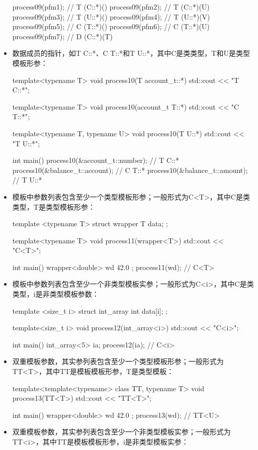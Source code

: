 \begin{itemize}
\begin{cpp}
{	process09(pfm1); // T (C::*)()
	process09(pfm2); // T (C::*)(U)
	process09(pfm3); // T (U::*)()
	process09(pfm4); // T (U::*)(V)
	process09(pfm5); // C (T::*)()
	process09(pfm6); // C (T::*)(U)
	process09(pfm7); // D (C::*)(T)
}
\end{cpp}
  \item 数据成员的指针，如T C::*、C T::*和T U::*，其中C是类类型，T和U是类型模板形参：

\begin{cpp}
template<typename T>
void process10(T account_t::*)
{ std::cout << "T C::*\n"; }

template<typename T>
void process10(account_t T::*)
{ std::cout << "C T::*\n"; }

template<typename T, typename U>
void process10(T U::*) { std::cout << "T U::*\n"; }

int main()
{
	process10(&account_t::number); // T C::*
	process10(&balance_t::account); // C T::*
	process10(&balance_t::amount); // T U::*
}
\end{cpp}
  \item 模板中参数列表包含至少一个类型模板形参；一般形式为C<T>，其中C是类类型，T是类型模板形参：

\begin{cpp}
template <typename T>
struct wrapper
{
	T data;
};

template<typename T>
void process11(wrapper<T>) { std::cout << "C<T>\n"; }

int main()
{
	wrapper<double> wd{ 42.0 };
	process11(wd); // C<T>
}
\end{cpp}
  \item 模板中参数列表包含至少一个非类型模板实参；一般形式为C<i>，其中C是类类型，i是非类型模板参数：

\begin{cpp}
template <size_t i>
struct int_array
{
	int data[i];
};

template<size_t i>
void process12(int_array<i>) { std::cout << "C<i>\n"; }

int main()
{
	int_array<5> ia{};
	process12(ia); // C<i>
}
\end{cpp}
  \item 双重模板参数，其实参列表包含至少一个类型模板形参；一般形式为TT<T>，其中TT是模板模板形参，T是类型模板：

\begin{cpp}
template<template<typename> class TT, typename T>
void process13(TT<T>) { std::cout << "TT<T>\n"; }

int main()
{
	wrapper<double> wd{ 42.0 };
	process13(wd); // TT<U>
}
\end{cpp}
  \item 双重模板参数，其实参列表包含至少一个非类型模板实参；一般形式为TT<i>，其中TT是模板模板形参，i是非类型模板实参：


\end{itemize}
